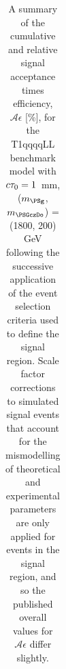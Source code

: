 \begin{table}[p]
\begin{center}
\begin{tabular}{lrr}
      \hline
        \end{tabular}
        \caption{A summary of the cumulative and relative signal acceptance times
        efficiency, $\mathcal{A}\epsilon$ [\%], for the
        T1qqqqLL benchmark model with $c\tau_{0}=1$~mm, ($m_{\PSg}$, $m_{\PSGczDo}$) = (1800, 200) GeV
        following the successive application of
        the event selection criteria used to define the signal region.  Scale
        factor corrections to simulated signal events that account for the
        mismodelling of theoretical and experimental parameters are only
        applied for events in the signal region, and so the published overall
        values for $\mathcal{A}\epsilon$ differ slightly.
}
        \label{tab:T1qqqqLL_1_1800_200_MR_sig}
    \end{center}
\end{table}

